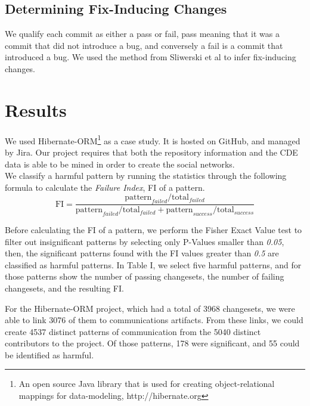 \documentclass[conference]{IEEEtran}
\begin{document}
\subsection{Determining Fix-Inducing Changes}
We qualify each commit as either a pass or fail, pass meaning that it was a commit that did not introduce a bug, and conversely a fail is a commit that introduced a bug.  We used the method from Sliwerski et al \cite{Sliwerski:2005:CIF:1083142.1083147} to infer fix-inducing changes. 

\section{Results}
We used Hibernate-ORM\footnote{An open source Java library that is used for creating object-relational mappings for data-modeling, http://hibernate.org} as a case study.  It is hosted on GitHub, and managed by Jira\footnotemark[2].  Our project requires that both the repository information and the CDE data is able to be mined in order to create the social networks.\\

We classify a harmful pattern by running the statistics through the following formula to calculate the \emph{Failure Index}, FI of a pattern.\\

\begin{equation}
\text{FI} = \frac{\text{pattern}_{failed}/ \text{total}_{failed}}{\text{pattern}_{failed} / \text{total}_{failed} + \text{pattern}_{success} /\text{total}_{success}}
\end{equation}

Before calculating the FI of a pattern, we perform the Fisher Exact Value test to filter out insignificant patterns by selecting only P-Values smaller than \emph{0.05}, then, the significant patterns found with the FI values greater than \emph{0.5} are classified as harmful patterns.  In Table I, we select five harmful patterns, and for those patterns show the number of passing changesets, the number of failing changesets, and the resulting FI.

For the Hibernate-ORM project, which had a total of 3968 changesets, we were able to link 3076 of them to communications artifacts.  From these links, we could create 4537 distinct patterns of communication from the 5040 distinct contributors to the project.  Of those patterns, 178 were significant, and 55 could be identified as harmful. 
\end{document}
